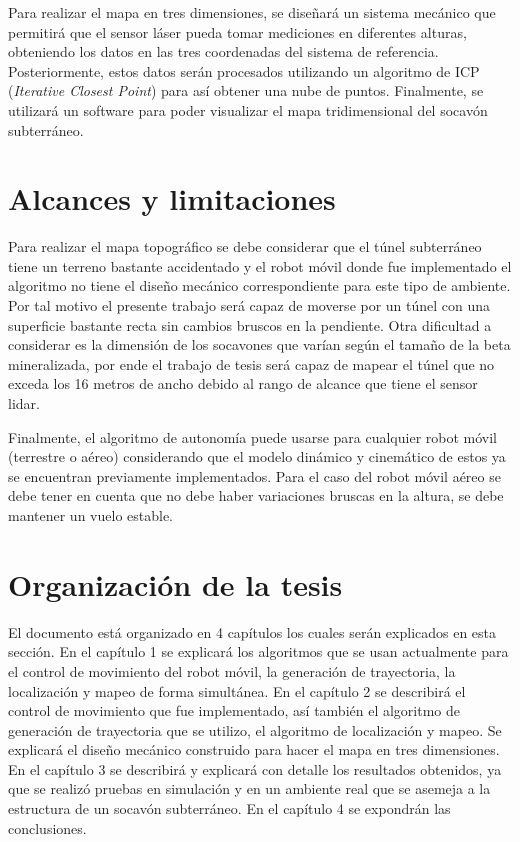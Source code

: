 Para realizar el mapa en tres dimensiones, se diseñar\'a un sistema mec\'anico 
que permitir\'a que el sensor l\'aser pueda tomar mediciones en diferentes 
alturas, obteniendo los datos en las tres coordenadas del sistema de 
referencia. Posteriormente, estos datos serán procesados utilizando un 
algoritmo de ICP (\textit{Iterative Closest Point}) para as\'i obtener una 
nube de puntos. Finalmente, se utilizar\'a un software para poder visualizar 
el mapa tridimensional del socavón subterr\'aneo.

\section{Alcances y limitaciones}

Para realizar el mapa topogr\'afico se debe considerar que el t\'unel subterr\'aneo 
tiene un terreno bastante accidentado y el robot m\'ovil donde fue implementado el 
algoritmo no tiene el diseño mec\'anico correspondiente para este tipo de ambiente. Por 
tal motivo el presente trabajo ser\'a capaz de moverse por un t\'unel con una superficie 
bastante recta sin cambios bruscos en la pendiente. Otra dificultad a considerar es la 
dimensi\'on de los socavones que var\'ian seg\'un el tama\~no de la beta mineralizada, por 
ende el trabajo de tesis ser\'a capaz de mapear el t\'unel que no exceda los 16 metros de 
ancho debido al rango de alcance que tiene el sensor lidar. 

Finalmente, el algoritmo de autonom\'ia puede usarse para cualquier robot m\'ovil (terrestre 
o a\'ereo) considerando que el modelo din\'amico y cinem\'atico de estos ya se encuentran 
previamente implementados. Para el caso del robot m\'ovil a\'ereo se debe tener en cuenta 
que no debe haber variaciones bruscas en la altura, se debe mantener un vuelo estable.

\section{Organizaci\'on de la tesis}

El documento está organizado en 4 capítulos los cuales serán explicados en esta
sección. En el capítulo 1 se explicará los algoritmos que se usan actualmente para el 
control de movimiento del robot móvil, la generación de trayectoria, la localización y 
mapeo de forma simultánea. En el capítulo 2 se describirá el control de movimiento que 
fue implementado, así también el algoritmo de generación de trayectoria que se utilizo, 
el algoritmo de localización y mapeo. Se explicará el diseño mecánico construido
para hacer el mapa en tres dimensiones. En el capítulo 3 se describirá y explicará con detalle
los resultados obtenidos, ya que se realizó pruebas en simulación y en un ambiente real que 
se asemeja a la estructura de un socavón subterráneo. En el capítulo 4 se expondrán las conclusiones.